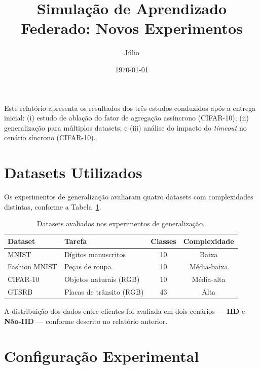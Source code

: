 \documentclass[12pt, a4paper]{article}
\title{\large\textbf{Simulação de Aprendizado Federado: Novos Experimentos}}
\author{Júlio}
\date{\today}
\begin{document}
\maketitle

Este relatório apresenta os resultados dos três estudos conduzidos após a entrega
inicial: (i) estudo de ablação do fator de agregação assíncrono (CIFAR-10);
(ii) generalização para múltiplos datasets; e (iii) análise do impacto do
\textit{timeout} no cenário síncrono (CIFAR-10).

\section{Datasets Utilizados}

Os experimentos de generalização avaliaram quatro datasets com complexidades distintas,
conforme a Tabela~\ref{tab:datasets}.

\begin{table}[H]
\centering
\caption{Datasets avaliados nos experimentos de generalização.}
\label{tab:datasets}
\renewcommand{\arraystretch}{1.25}
\begin{tabular}{llcc}
\toprule
\textbf{Dataset} & \textbf{Tarefa} & \textbf{Classes} & \textbf{Complexidade} \\
\midrule
MNIST        & Dígitos manuscritos      & 10 & Baixa       \\
Fashion MNIST & Peças de roupa          & 10 & Média-baixa \\
CIFAR-10     & Objetos naturais (RGB)   & 10 & Média-alta  \\
GTSRB        & Placas de trânsito (RGB) & 43 & Alta        \\
\bottomrule
\end{tabular}
\end{table}

A distribuição dos dados entre clientes foi avaliada em dois cenários —
\textbf{IID} e \textbf{Não-IID} — conforme descrito no relatório anterior.

\section{Configuração Experimental}
\end{document}

